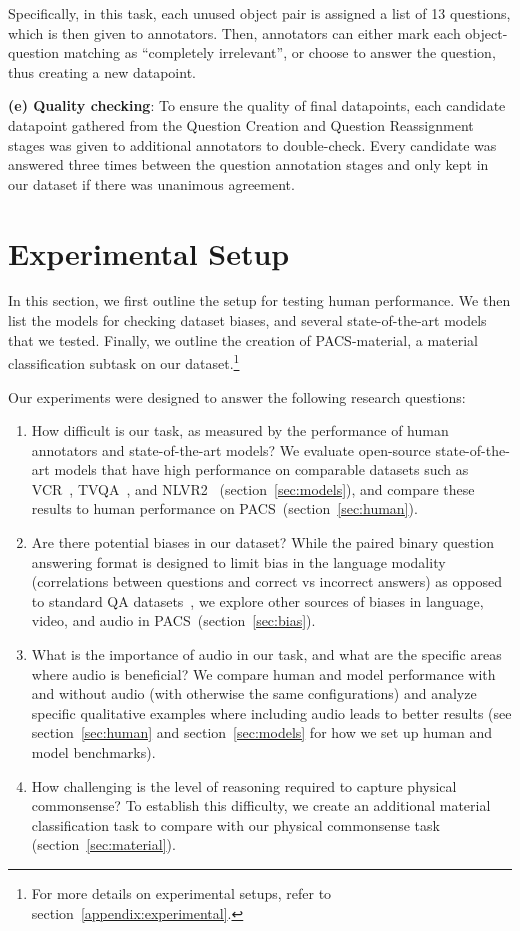 \documentclass[runningheads]{llncs}
\newcommand{\names}{\textsc{PACS}}
\begin{document}
Specifically, in this task, each unused object pair is assigned a list of 13 questions, which is then given to annotators.
Then, annotators can either mark each object-question matching as ``completely irrelevant'', or choose to answer the question, thus creating a new datapoint. 



\noindent \textbf{(e) Quality checking}: To ensure the quality of final datapoints, each candidate datapoint gathered from the Question Creation and Question Reassignment stages was given to additional annotators to double-check. Every candidate was answered three times between the question annotation stages and only kept in our dataset if there was unanimous agreement.

\section{Experimental Setup}


In this section, we first outline the setup for testing human performance. We then list the models for checking dataset biases, and several state-of-the-art models that we tested. Finally, we outline the creation of \names-material, a material classification subtask on our dataset.\footnote{For more details on experimental setups, refer to section~\ref{appendix:experimental}.} 

Our experiments were designed to answer the following research questions:
\begin{enumerate}
    \item How difficult is our task, as measured by the performance of human annotators and state-of-the-art models? We evaluate open-source state-of-the-art models that have high performance on comparable datasets such as VCR~\cite{zellers2019vcr}, TVQA~\cite{lei2018tvqa}, and NLVR2~\cite{chen2020uniter} (section~\ref{sec:models}), and compare these results to human performance on \names\ (section~\ref{sec:human}).
    \item Are there potential biases in our dataset? While the paired binary question answering format is designed to limit bias in the language modality (correlations between questions and correct vs incorrect answers) as opposed to standard QA datasets~\cite{agrawal2016analyzing,anand2018blindfold,jabri2016revisiting,zadeh2019socialiq}, we explore other sources of biases in language, video, and audio in \names\ (section~\ref{sec:bias}). 
    \item What is the importance of audio in our task, and what are the specific areas where audio is beneficial? We compare human and model performance with and without audio (with otherwise the same configurations) and analyze specific qualitative examples where including audio leads to better results (see section~\ref{sec:human} and section~\ref{sec:models} for how we set up human and model benchmarks).
    \item How challenging is the level of reasoning required to capture physical commonsense? To establish this difficulty, we create an additional material classification task to compare with our physical commonsense task (section~\ref{sec:material}).
\end{enumerate}
\end{document}
